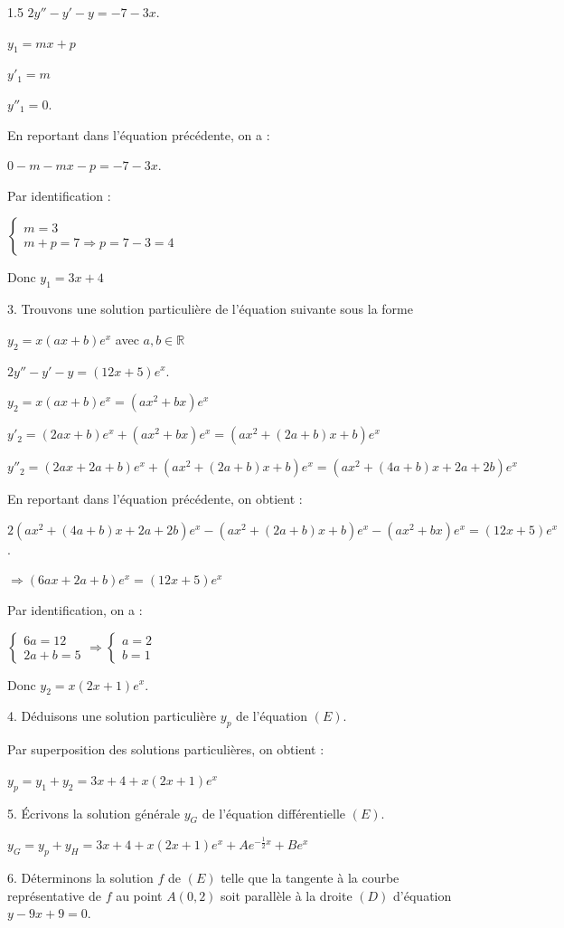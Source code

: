 \documentclass[12pt]{article}
\begin{document}
\begin{spacing}{1.5}
$2y''-y'-y=-7-3x$.

$y_1=mx+p$

$y'_1=m$

$y''_1=0$.

En reportant dans l'équation précédente, on a :

$0-m-mx-p=-7-3x$.

Par identification :

$\begin{cases}
m=3\\
m+p=7\Longrightarrow p=7-3=4
\end{cases}$

Donc $y_1=3x+4$


3. Trouvons une solution particulière de l'équation suivante sous la forme 

$y_2=x(ax+b)e^x$ avec $a,b\in \mathbb{R}$

$2y''-y'-y=(12x+5)e^x$.

$y_2=x(ax+b)e^x=(ax^2+bx)e^x$

$y'_2=(2ax+b)e^x+(ax^2+bx)e^x=(ax^2+(2a+b)x+b)e^x$

$y''_2=(2ax+2a+b)e^x+(ax^2+(2a+b)x+b)e^x=(ax^2+(4a+b)x+2a+2b)e^x$

En reportant dans l'équation précédente, on obtient :

$2(ax^2+(4a+b)x+2a+2b)e^x-(ax^2+(2a+b)x+b)e^x-(ax^2+bx)e^x=(12x+5)e^x$.

$\Rightarrow (6ax+2a+b)e^x=(12x+5)e^x$

Par identification, on a :

$\begin{cases}
6a=12\\
2a+b=5
\end{cases}\Rightarrow \begin{cases}
a=2\\
b=1
\end{cases}$

Donc $y_2=x(2x+1)e^x$.

4. Déduisons une solution particulière $y_p$ de l'équation $(E)$.

Par superposition des solutions particulières, on obtient :

$y_p=y_1+y_2=3x+4+x(2x+1)e^x$

5. Écrivons la solution générale $y_G$ de l'équation différentielle $(E)$.

$y_G=y_p+y_H=3x+4+x(2x+1)e^x+Ae^{-\frac{1}{2}x}+Be^x$


6. Déterminons la solution $f$ de $(E)$ telle que la tangente à la courbe représentative de $f$ au point $A(0,2)$ soit parallèle à la droite $(D)$ d'équation $y-9x+9=0$.


\end{spacing}
\end{document}
